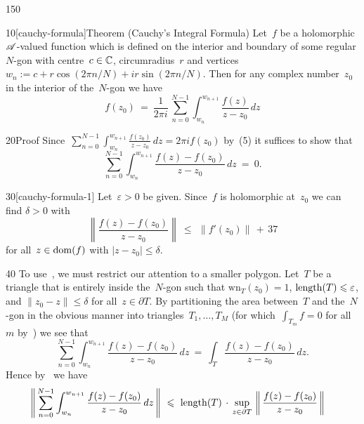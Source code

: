 \begin{parsec}{150}%
\begin{point}{10}[cauchy-formula]{Theorem (Cauchy's Integral Formula)}%
%
Let~$f$ be a holomorphic $\mathscr{A}$-valued function
which is defined on the interior and boundary
of some regular $N$-gon 
with centre~$c\in\mathbb{C}$,
circumradius~$r$
and vertices $w_n := c+r\cos(2\pi n/N)+ir\sin(2\pi n/N)$.
Then for any complex number~$z_0$ in
the interior of the~$N$-gon
we have
\begin{equation*}
	f(z_0)\ = \ \frac{1}{2\pi i}\,\sum_{n=0}^{N-1}\int_{w_n}^{w_{n+1}}
	\frac{f(z)}{z-z_0}\,dz
\end{equation*}
\begin{point}{20}{Proof}%
	Since~$\sum_{n=0}^{N-1} \int_{w_n}^{w_{n+1}} \frac{f(z_0)}{z-z_0}\,dz
	= 2\pi i f(z_0)$ by~(5)
it suffices to show that
\begin{equation}
\label{eq:cauchy-formula-1}
\sum_{n=0}^{N-1}\int_{w_n}^{w_{n+1}} \frac{f(z)-f(z_0)}{z-z_0}\,dz \ = \ 0.
\end{equation}
\begin{point}{30}[cauchy-formula-1]%
Let~$\varepsilon>0$ be given.
Since~$f$ is holomorphic at~$z_0$
we can find $\delta>0$ with
\begin{equation*}
\left\|\frac{f(z)-f(z_0)}{z-z_0}\right\|
\ \leq \ \,\|f'(z_0)\|\,+\,37
\end{equation*}
for all~$z\in\operatorname{dom}(f)$ with $\left|z-z_0\right|\leq \delta$. 
\end{point}
\begin{point}{40}%
To use~,
we must restrict our attention to a smaller polygon.
Let~$T$ be a triangle 
that is entirely inside the~$N$-gon
such that  $\mathrm{wn}_T(z_0)=1$,
$\operatorname{length}(T)\leqslant \varepsilon$,
and $\|z_0-z\|\leq \delta$ for all~$z\in \partial T$.
By partitioning the area
between~$T$ and the~$N$-gon
in the obvious manner
into triangles~$T_1,\dotsc,T_M$
(for which~$\int_{T_m}f=0$ for all~$m$ by~)
we see that
\begin{equation}
\label{eq:cauchy-formula-2}
\sum_{n=0}^{N-1}\int_{w_n}^{w_{n+1}} \frac{f(z)-f(z_0)}{z-z_0}\,dz
\ = \ 
\int_T \frac{f(z)-f(z_0)}{z-z_0}\,dz.
\end{equation}
Hence by~
we have
\begin{alignat*}{3}
	\left\|\,\sum_{n=0}^{N-1} 
	\int_{w_n}^{w_{n+1}} \frac{f(z)-f(z_0)}{z-z_0}\,dz\,\right\|
	\ &\leq \ \length(T)\,\cdot\,
\sup_{z\in\partial T} \,\left\|\,\frac{f(z)-f(z_0)}{z-z_0}\,\right\|

\end{alignat*}
\end{point}
\end{point}
\end{point}
\end{parsec}
